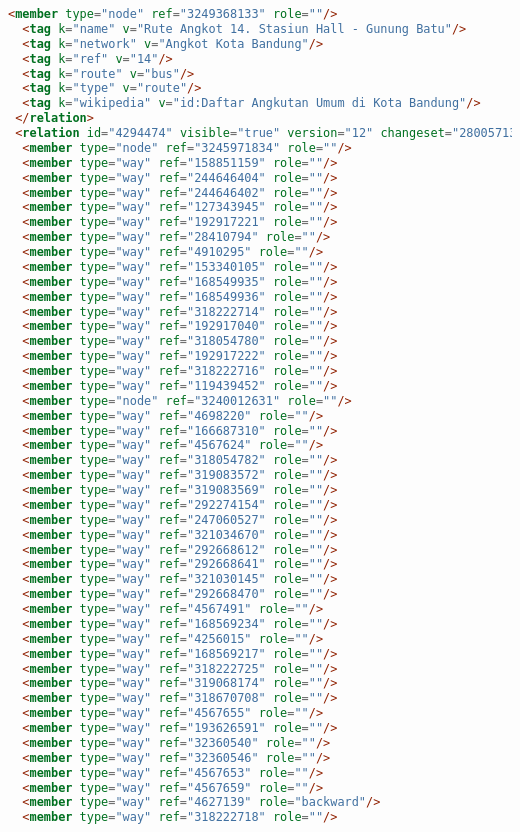 \begin{lstlisting}[language=HTML,basicstyle=\tiny,caption=bandung1.xml]
  <member type="node" ref="3249368133" role=""/>
  <tag k="name" v="Rute Angkot 14. Stasiun Hall - Gunung Batu"/>
  <tag k="network" v="Angkot Kota Bandung"/>
  <tag k="ref" v="14"/>
  <tag k="route" v="bus"/>
  <tag k="type" v="route"/>
  <tag k="wikipedia" v="id:Daftar Angkutan Umum di Kota Bandung"/>
 </relation>
 <relation id="4294474" visible="true" version="12" changeset="28005713" timestamp="2015-01-08T20:32:47Z" user="isonpurba" uid="2552445">
  <member type="node" ref="3245971834" role=""/>
  <member type="way" ref="158851159" role=""/>
  <member type="way" ref="244646404" role=""/>
  <member type="way" ref="244646402" role=""/>
  <member type="way" ref="127343945" role=""/>
  <member type="way" ref="192917221" role=""/>
  <member type="way" ref="28410794" role=""/>
  <member type="way" ref="4910295" role=""/>
  <member type="way" ref="153340105" role=""/>
  <member type="way" ref="168549935" role=""/>
  <member type="way" ref="168549936" role=""/>
  <member type="way" ref="318222714" role=""/>
  <member type="way" ref="192917040" role=""/>
  <member type="way" ref="318054780" role=""/>
  <member type="way" ref="192917222" role=""/>
  <member type="way" ref="318222716" role=""/>
  <member type="way" ref="119439452" role=""/>
  <member type="node" ref="3240012631" role=""/>
  <member type="way" ref="4698220" role=""/>
  <member type="way" ref="166687310" role=""/>
  <member type="way" ref="4567624" role=""/>
  <member type="way" ref="318054782" role=""/>
  <member type="way" ref="319083572" role=""/>
  <member type="way" ref="319083569" role=""/>
  <member type="way" ref="292274154" role=""/>
  <member type="way" ref="247060527" role=""/>
  <member type="way" ref="321034670" role=""/>
  <member type="way" ref="292668612" role=""/>
  <member type="way" ref="292668641" role=""/>
  <member type="way" ref="321030145" role=""/>
  <member type="way" ref="292668470" role=""/>
  <member type="way" ref="4567491" role=""/>
  <member type="way" ref="168569234" role=""/>
  <member type="way" ref="4256015" role=""/>
  <member type="way" ref="168569217" role=""/>
  <member type="way" ref="318222725" role=""/>
  <member type="way" ref="319068174" role=""/>
  <member type="way" ref="318670708" role=""/>
  <member type="way" ref="4567655" role=""/>
  <member type="way" ref="193626591" role=""/>
  <member type="way" ref="32360540" role=""/>
  <member type="way" ref="32360546" role=""/>
  <member type="way" ref="4567653" role=""/>
  <member type="way" ref="4567659" role=""/>
  <member type="way" ref="4627139" role="backward"/>
  <member type="way" ref="318222718" role=""/>

\end{lstlisting}
